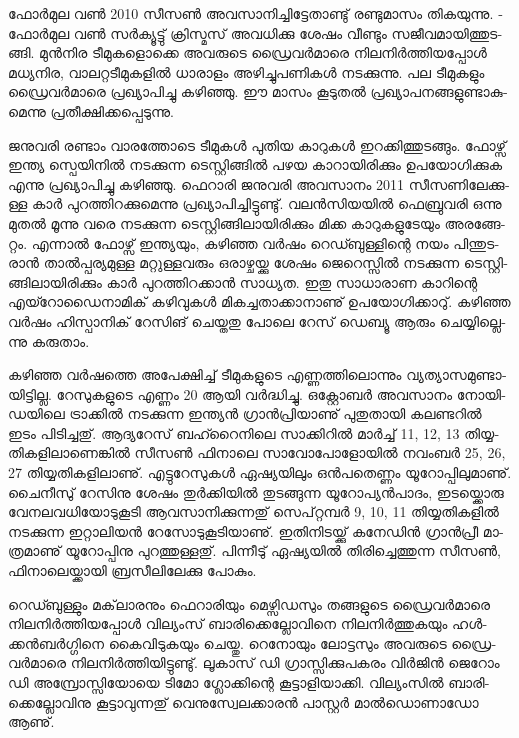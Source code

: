 \vskip 2pt

ഫോര്‍­മുല വണ്‍ 2010 സീ­സണ്‍ അവ­സാ­നി­ച്ചി­ട്ടേ­താ­ണ്ടു് രണ്ടു­മാ­സം തി­ക­യു­ന്നു. ­ഫോര്‍­മുല വണ്‍ സര്‍­ക്യൂ­ട്ടു് 
ക്രി­സ്മ­സ് അവ­ധി­ക്കു ശേ­ഷം വീ­ണ്ടും സജീ­വ­മാ­യി­ത്തു­ട­ങ്ങി. മുന്‍­നിര ടീ­മു­ക­ളൊ­ക്കെ അവ­രു­ടെ ഡ്രൈ­വര്‍­മാ­രെ 
നി­ല­നിര്‍­ത്തി­യ­പ്പോള്‍ മധ്യ­നി­ര, വാ­ല­റ്റ­ടീ­മു­ക­ളില്‍ ധാ­രാ­ളം അഴി­ച്ചു­പ­ണി­കള്‍ നട­ക്കു­ന്നു. പല ടീ­മു­ക­ളും ഡ്രൈ­വര്‍­മാ­രെ 
പ്ര­ഖ്യാ­പി­ച്ചു കഴി­ഞ്ഞു. ഈ മാ­സം കൂ­ടു­തല്‍ പ്ര­ഖ്യാ­പ­ന­ങ്ങ­ളു­ണ്ടാ­കു­മെ­ന്നു പ്ര­തീ­ക്ഷി­ക്ക­പ്പെ­ടു­ന്നു.

­ജ­നു­വ­രി രണ്ടാം വാ­ര­ത്തോ­ടെ ടീ­മു­കള്‍ പു­തിയ കാ­റു­കള്‍ ഇറ­ക്കി­ത്തു­ട­ങ്ങും. ഫോ­ഴ്സ് ഇന്ത്യ സ്പെ­യി­നില്‍ നട­ക്കു­ന്ന 
ടെ­സ്റ്റി­ങ്ങില്‍ പഴയ കാ­റാ­യി­രി­ക്കും ഉപ­യോ­ഗി­ക്കുക എന്നു പ്ര­ഖ്യാ­പി­ച്ചു കഴി­ഞ്ഞു. ഫെ­റാ­രി ജനു­വ­രി അവ­സാ­നം 2011 
സീ­സ­ണി­ലേ­ക്കു­ള്ള കാര്‍ പു­റ­ത്തി­റ­ക്കു­മെ­ന്നു പ്ര­ഖ്യാ­പി­ച്ചി­ട്ടു­ണ്ടു്. വലന്‍­സി­യ­യില്‍ ഫെ­ബ്രു­വ­രി ഒന്നു മു­തല്‍ മൂ­ന്നു വരെ 
നട­ക്കു­ന്ന ടെ­സ്റ്റി­ങ്ങി­ലാ­യി­രി­ക്കും മി­ക്ക കാ­റു­ക­ളു­ടേ­യും അര­ങ്ങേ­റ്റം. എന്നാല്‍ ഫോ­ഴ്സ് ഇന്ത്യ­യും, കഴി­ഞ്ഞ വര്‍­ഷം 
റെ­ഡ്ബു­ള്ളി­ന്റെ നയം പി­ന്തു­ട­രാന്‍ താല്‍­പ്പ­ര്യ­മു­ള്ള മറ്റു­ള്ള­വ­രും ഒരാ­ഴ്ച­യ്ക്കു ശേ­ഷം ജെ­റെ­സ്സില്‍ നട­ക്കു­ന്ന 
ടെ­സ്റ്റി­ങ്ങി­ലാ­യി­രി­ക്കും കാര്‍ പു­റ­ത്തി­റ­ക്കാന്‍ സാ­ധ്യ­ത. ഇതു സാ­ധാ­രാണ കാ­റി­ന്റെ എയ്റോ­ഡൈ­നാ­മി­ക് കഴി­വു­കള്‍ 
മി­ക­ച്ച­താ­ക്കാ­നാ­ണു് ഉപ­യോ­ഗി­ക്കാ­റു്. കഴി­ഞ്ഞ വര്‍­ഷം ഹി­സ്പാ­നി­ക് റേ­സി­ങ് ചെ­യ്ത­തു പോ­ലെ റേ­സ് ഡെ­ബ്യൂ ആരും 
ചെ­യ്യി­ല്ലെ­ന്നു കരു­താം­.

­ക­ഴി­ഞ്ഞ വര്‍­ഷ­ത്തെ അപേ­ക്ഷി­ച്ച് ടീ­മു­ക­ളു­ടെ എണ്ണ­ത്തി­ലൊ­ന്നും വ്യ­ത്യാ­സ­മു­ണ്ടാ­യി­ട്ടി­ല്ല. റേ­സു­ക­ളു­ടെ എണ്ണം 20 
ആയി വര്‍­ദ്ധി­ച്ചു. ഒക്റ്റോ­ബര്‍ അവ­സാ­നം നോ­യി­ഡ­യി­ലെ ട്രാ­ക്കില്‍ നട­ക്കു­ന്ന ഇന്ത്യന്‍ ഗ്രാന്‍­പ്രി­യാ­ണു് പു­തു­താ­യി 
കല­ണ്ട­റില്‍ ഇടം പി­ടി­ച്ച­തു്. ആദ്യ­റേ­സ് ബഹ്റൈ­നി­ലെ സാ­ക്കി­റില്‍ മാര്‍­ച്ച് 11, 12, 13 തി­യ്യ­തി­ക­ളി­ലാ­ണെ­ങ്കില്‍ 
സീ­സണ്‍ ഫി­നാ­ലെ സാ­വോ­പോ­ളോ­യില്‍ നവം­ബര്‍ 25, 26, 27 തി­യ്യ­തി­ക­ളി­ലാ­ണു്. എട്ടു­റേ­സു­കള്‍ ഏഷ്യ­യി­ലും 
ഒന്‍­പ­തെ­ണ്ണം യൂ­റോ­പ്പി­ലു­മാ­ണു്. ചൈ­നീ­സു് റേ­സി­നു ശേ­ഷം തുര്‍­ക്കി­യില്‍ തു­ട­ങ്ങു­ന്ന യൂ­റോ­പ്യന്‍­പാ­ദം, ഇട­യ്ക്കൊ­രു 
വേ­ന­ല­വ­ധി­യോ­ടു­കൂ­ടി ആവ­സാ­നി­ക്കു­ന്ന­തു് സെ­പ്റ്റ­മ്പര്‍ 9, 10, 11 തി­യ്യ­തി­ക­ളില്‍ നട­ക്കു­ന്ന ഇറ്റാ­ലി­യന്‍ 
റേ­സോ­ടു­കൂ­ടി­യാ­ണു്. ഇതി­നി­ട­യ്ക്കു് കനേ­ഡിന്‍ ഗ്രാന്‍­പ്രീ മാ­ത്ര­മാ­ണു് യൂ­റോ­പ്പി­നു പു­റ­ത്തു­ള്ള­തു്. പി­ന്നീ­ടു് ഏഷ്യ­യില്‍ 
തി­രി­ച്ചെ­ത്തു­ന്ന സീ­സണ്‍, ഫി­നാ­ലെ­യ്ക്കാ­യി ബ്ര­സീ­ലി­ലേ­ക്കു പോ­കും­.

­റെ­ഡ്ബു­ള്ളും മക്‌­ലാ­ര­നും ഫെ­റാ­രി­യും മെ­ഴ്സി­ഡ­സും തങ്ങ­ളു­ടെ ഡ്രൈ­വര്‍­മാ­രെ നി­ല­നിര്‍­ത്തി­യ­പ്പോള്‍ വി­ല്യം­സ് 
ബാ­രി­ക്കെ­ല്ലോ­വി­നെ നി­ല­നിര്‍­ത്തു­ക­യും ഹള്‍­ക്കന്‍­ബര്‍­ഗ്ഗി­നെ കൈ­വി­ടു­ക­യും ചെ­യ്തു. റെ­നോ­യും ലോ­ട്ട­സും അവ­രു­ടെ 
ഡ്രൈ­വര്‍­മാ­രെ നി­ല­നിര്‍­ത്തി­യി­ട്ടു­ണ്ടു്. ലൂ­കാ­സ് ഡി ഗ്രാ­സ്സി­ക്കു­പ­ക­രം വിര്‍­ജിന്‍ ജെ­റോം ഡി അമ്പ്രോ­സ്സി­യോ­യെ ടി­മോ 
ഗ്ലോ­ക്കി­ന്റെ കൂ­ട്ടാ­ളി­യാ­ക്കി. വി­ല്യം­സില്‍ ബാ­രി­ക്കെ­ല്ലോ­വി­നു കൂ­ട്ടാ­വു­ന്ന­തു് വെ­നു­സ്വേ­ല­ക്കാ­രന്‍ പാ­സ്റ്റര്‍ 
മാല്‍­ഡൊ­ണാ­ഡോ ആണു്.

